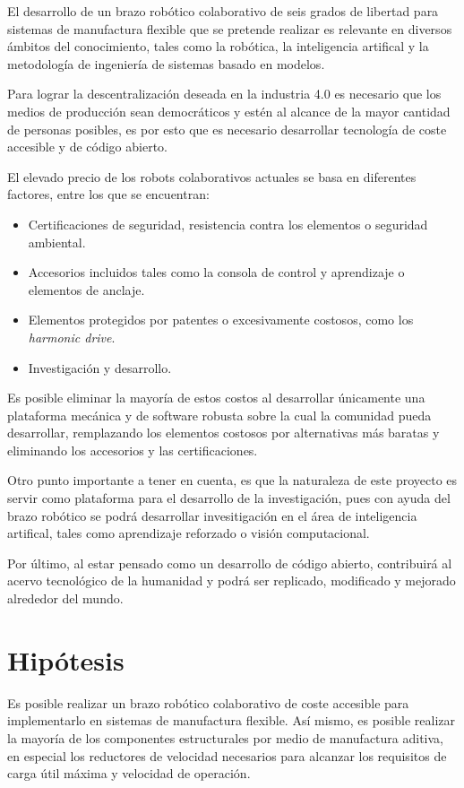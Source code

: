 El desarrollo de un brazo robótico colaborativo de seis grados de libertad para sistemas de manufactura flexible que se pretende realizar es relevante en diversos ámbitos del conocimiento, tales como la robótica, la inteligencia artifical y la metodología de ingeniería de sistemas basado en modelos.

Para lograr la descentralización deseada en la industria 4.0 es necesario que los medios de producción sean democráticos y estén al alcance de la mayor cantidad de personas posibles, es por esto que es necesario desarrollar tecnología de coste accesible y de código abierto.

El elevado precio de los robots colaborativos actuales se basa en diferentes factores, entre los que se encuentran:

\begin{itemize}
\item Certificaciones de seguridad, resistencia contra los elementos o seguridad ambiental.
\item Accesorios incluidos tales como la consola de control y aprendizaje o elementos de anclaje.
\item Elementos protegidos por patentes o excesivamente costosos, como los \textit{harmonic drive}.
\item Investigación y desarrollo.
\end{itemize}

Es posible eliminar la mayoría de estos costos al desarrollar únicamente una plataforma mecánica y de software robusta sobre la cual la comunidad pueda desarrollar, remplazando los elementos costosos por alternativas más baratas y eliminando los accesorios y las certificaciones.

Otro punto importante a tener en cuenta, es que la naturaleza de este proyecto es servir como plataforma para el desarrollo de la investigación, pues con ayuda del brazo robótico se podrá desarrollar invesitigación en el área de inteligencia artifical, tales como aprendizaje reforzado o visión computacional.

Por último, al estar pensado como un desarrollo de código abierto, contribuirá al acervo tecnológico de la humanidad y podrá ser replicado, modificado y mejorado alrededor del mundo. 


\section{Hipótesis}

Es posible realizar un brazo robótico colaborativo de coste accesible para implementarlo en sistemas de manufactura flexible. Así mismo, es posible realizar la mayoría de los componentes estructurales por medio de manufactura aditiva, en especial los reductores de velocidad necesarios para alcanzar los requisitos de carga útil máxima y velocidad de operación.

